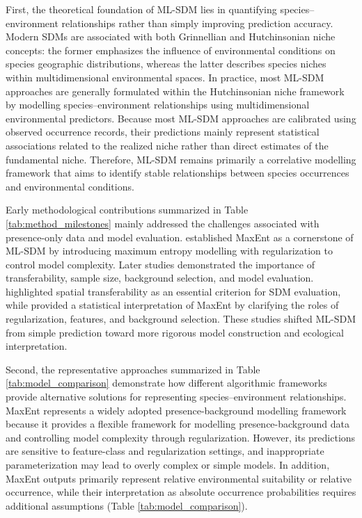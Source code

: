 \documentclass[authoryear,preprint,review,12pt]{elsarticle}
\begin{document}
First, the theoretical foundation of ML-SDM lies in quantifying species–environment relationships rather than simply improving prediction accuracy. Modern SDMs are associated with both Grinnellian and Hutchinsonian niche concepts: the former emphasizes the influence of environmental conditions on species geographic distributions, whereas the latter describes species niches within multidimensional environmental spaces\citep{grinnell1917niche,hutchinson1957cold}. In practice, most ML-SDM approaches are generally formulated within the Hutchinsonian niche framework by modelling species–environment relationships using multidimensional environmental predictors. Because most ML-SDM approaches are calibrated using observed occurrence records, their predictions mainly represent statistical associations related to the realized niche rather than direct estimates of the fundamental niche. Therefore, ML-SDM remains primarily a correlative modelling framework that aims to identify stable relationships between species occurrences and environmental conditions.

Early methodological contributions summarized in Table \ref{tab:method_milestones} mainly addressed the challenges associated with presence-only data and model evaluation. \cite{phillips2006maximum} established MaxEnt as a cornerstone of ML-SDM by introducing maximum entropy modelling with regularization to control model complexity. Later studies demonstrated the importance of transferability, sample size, background selection, and model evaluation. \cite{pearson2007predicting} highlighted spatial transferability as an essential criterion for SDM evaluation, while \cite{elith2011statistical} provided a statistical interpretation of MaxEnt by clarifying the roles of regularization, features, and background selection. These studies shifted ML-SDM from simple prediction toward more rigorous model construction and ecological interpretation.

Second, the representative approaches summarized in Table \ref{tab:model_comparison} demonstrate how different algorithmic frameworks provide alternative solutions for representing species–environment relationships. MaxEnt represents a widely adopted presence-background modelling framework because it provides a flexible framework for modelling presence-background data and controlling model complexity through regularization. However, its predictions are sensitive to feature-class and regularization settings, and inappropriate parameterization may lead to overly complex or simple models. In addition, MaxEnt outputs primarily represent relative environmental suitability or relative occurrence, while their interpretation as absolute occurrence probabilities requires additional assumptions (Table \ref{tab:model_comparison}).
\end{document}
